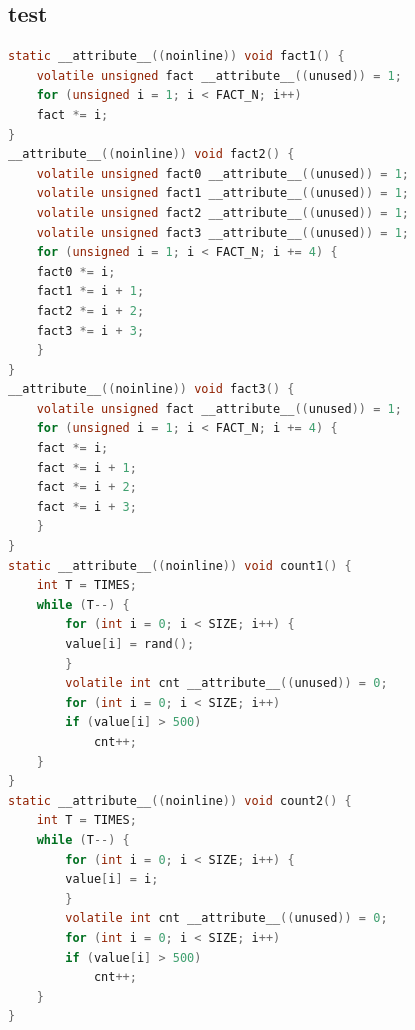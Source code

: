 \documentclass[
	a4paper, %
	11pt, %
]{CSUniSchoolLabReport}
\begin{document}
\subsection{test}
\begin{lstlisting}[language=C]
static __attribute__((noinline)) void fact1() {
    volatile unsigned fact __attribute__((unused)) = 1;
    for (unsigned i = 1; i < FACT_N; i++)
    fact *= i;
}
__attribute__((noinline)) void fact2() {
    volatile unsigned fact0 __attribute__((unused)) = 1;
    volatile unsigned fact1 __attribute__((unused)) = 1;
    volatile unsigned fact2 __attribute__((unused)) = 1;
    volatile unsigned fact3 __attribute__((unused)) = 1;
    for (unsigned i = 1; i < FACT_N; i += 4) {
    fact0 *= i;
    fact1 *= i + 1;
    fact2 *= i + 2;
    fact3 *= i + 3;
    }
}
__attribute__((noinline)) void fact3() {
    volatile unsigned fact __attribute__((unused)) = 1;
    for (unsigned i = 1; i < FACT_N; i += 4) {
    fact *= i;
    fact *= i + 1;
    fact *= i + 2;
    fact *= i + 3;
    }
}
static __attribute__((noinline)) void count1() {
    int T = TIMES;
    while (T--) {
        for (int i = 0; i < SIZE; i++) {
        value[i] = rand();
        }
        volatile int cnt __attribute__((unused)) = 0;
        for (int i = 0; i < SIZE; i++)
        if (value[i] > 500)
            cnt++;
    }
}
static __attribute__((noinline)) void count2() {
    int T = TIMES;
    while (T--) {
        for (int i = 0; i < SIZE; i++) {
        value[i] = i;
        }
        volatile int cnt __attribute__((unused)) = 0;
        for (int i = 0; i < SIZE; i++)
        if (value[i] > 500)
            cnt++;
    }
}
\end{lstlisting}
\end{document}
